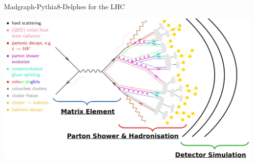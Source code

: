 \documentclass{bredelebeamer}
\begin{document}
\begin{frame}{Madgraph-Pythia8-Delphes for the LHC}
	\begin{center}
		\includegraphics[width=.99\linewidth]{Madgraph.png}
	\end{center}
\end{frame}
\end{document}
